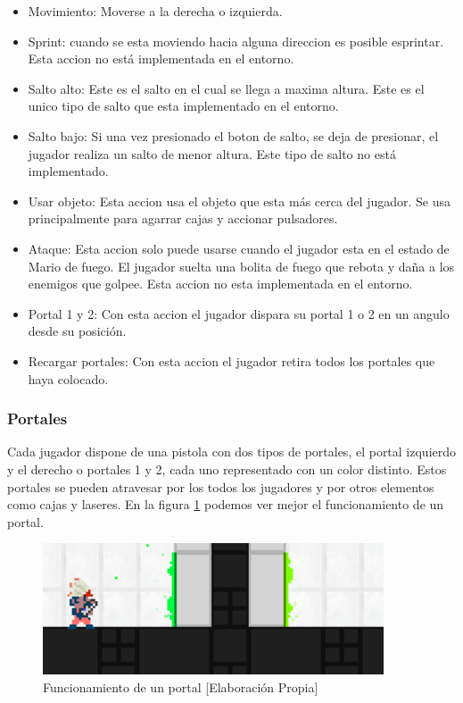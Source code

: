 \begin{itemize}
    \item Movimiento: Moverse a la derecha o izquierda.
    \item Sprint: cuando se esta moviendo hacia alguna direccion es posible esprintar. Esta accion no está implementada en el entorno.
    \item Salto alto: Este es el salto en el cual se llega a maxima altura. Este es el unico tipo de salto que esta implementado en el entorno.
    \item Salto bajo: Si una vez presionado el boton de salto, se deja de presionar, el jugador realiza un salto de menor altura. Este tipo de salto no está implementado.
    \item Usar objeto: Esta accion usa el objeto que esta más cerca del jugador. Se usa principalmente para agarrar cajas y accionar pulsadores.
    \item Ataque: Esta accion solo puede usarse cuando el jugador esta en el estado de Mario de fuego. El jugador suelta una bolita de fuego que rebota y daña a los enemigos que golpee. Esta accion no esta implementada en el entorno.
    \item Portal 1 y 2: Con esta accion el jugador dispara su portal 1 o 2 en un angulo desde su posición.
    \item Recargar portales: Con esta accion el jugador retira todos los portales que haya colocado.
\end{itemize}

\subsubsection*{Portales}

Cada jugador dispone de una pistola con dos tipos de portales, el portal izquierdo y el derecho o portales 1 y 2, cada uno representado con un color distinto. Estos portales se pueden atravesar por los todos los jugadores y por otros elementos como cajas y laseres. En la figura \ref {fig:portal} podemos ver mejor el funcionamiento de un portal.

\begin{figure}[h]
    \centering
    \includegraphics[width=0.9\textwidth]{img/portal-function.png}
    \caption{Funcionamiento de un portal [Elaboración Propia]}
    \label{fig:portal}
\end{figure}

